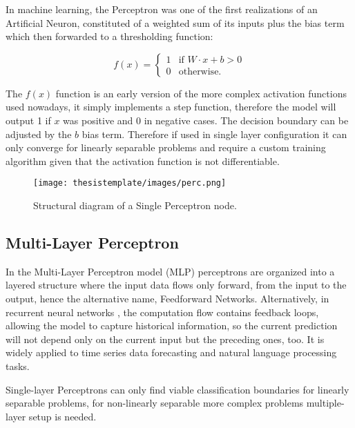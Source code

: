 In machine learning, the Perceptron \cite{rosenblatt1958perceptron} was one of the first realizations of an Artificial Neuron, constituted of a weighted sum of its inputs plus the bias term which then forwarded to a thresholding function:


\begin{equation}
      f(x) =
    \begin{cases}
      1 & \text{if $W\cdot x + b > 0$}\\
      0 & \text{otherwise.}
    \end{cases} 
\end{equation}

The $f(x)$ function is an early version of the more complex activation functions used nowadays, it simply implements a step function, therefore the model will output 1 if $x$ was positive and 0 in negative cases. The decision boundary can be adjusted by the $b$ bias term. Therefore if used in single layer configuration it can only converge for linearly separable problems and require a custom training algorithm given that the activation function is not differentiable.

\begin{figure}[ht]
  \begin{center}
    \texttt{[image: thesistemplate/images/perc.png]}
    \caption{Structural diagram of a Single Perceptron node.}
    \label{fig:perceptron_struct}
  \end{center}
\end{figure}


\subsection{Multi-Layer Perceptron}


In the Multi-Layer Perceptron model (MLP) perceptrons are organized into a layered structure where the input data flows only forward, from the input to the output, hence the alternative name, Feedforward Networks. Alternatively, in recurrent neural networks \cite{sutskever2013training_rnn}, the computation flow contains feedback loops, allowing the model to capture historical information, so the current prediction will not depend only on the current input but the preceding ones, too. It is widely applied to time series data forecasting and natural language processing tasks.

Single-layer Perceptrons can only find viable classification boundaries for linearly separable problems, for non-linearly separable more complex problems multiple-layer setup is needed. 

